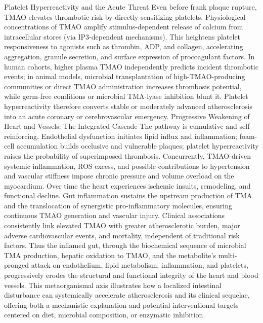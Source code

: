 Platelet Hyperreactivity and the Acute Threat
Even before frank plaque rupture, TMAO elevates thrombotic risk by directly sensitizing platelets. Physiological concentrations of TMAO amplify stimulus-dependent release of calcium from intracellular stores (via IP3-dependent mechanisms). This heightens platelet responsiveness to agonists such as thrombin, ADP, and collagen, accelerating aggregation, granule secretion, and surface expression of procoagulant factors. In human cohorts, higher plasma TMAO independently predicts incident thrombotic events; in animal models, microbial transplantation of high-TMAO-producing communities or direct TMAO administration increases thrombosis potential, while germ-free conditions or microbial TMA-lyase inhibition blunt it. Platelet hyperreactivity therefore converts stable or moderately advanced atherosclerosis into an acute coronary or cerebrovascular emergency.
Progressive Weakening of Heart and Vessels: The Integrated Cascade
The pathway is cumulative and self-reinforcing. Endothelial dysfunction initiates lipid influx and inflammation; foam-cell accumulation builds occlusive and vulnerable plaques; platelet hyperreactivity raises the probability of superimposed thrombosis. Concurrently, TMAO-driven systemic inflammation, ROS excess, and possible contributions to hypertension and vascular stiffness impose chronic pressure and volume overload on the myocardium. Over time the heart experiences ischemic insults, remodeling, and functional decline. Gut inflammation sustains the upstream production of TMA and the translocation of synergistic pro-inflammatory molecules, ensuring continuous TMAO generation and vascular injury. Clinical associations consistently link elevated TMAO with greater atherosclerotic burden, major adverse cardiovascular events, and mortality, independent of traditional risk factors.
Thus the inflamed gut, through the biochemical sequence of microbial TMA production, hepatic oxidation to TMAO, and the metabolite’s multi-pronged attack on endothelium, lipid metabolism, inflammation, and platelets, progressively erodes the structural and functional integrity of the heart and blood vessels. This metaorganismal axis illustrates how a localized intestinal disturbance can systemically accelerate atherosclerosis and its clinical sequelae, offering both a mechanistic explanation and potential interventional targets centered on diet, microbial composition, or enzymatic inhibition.
